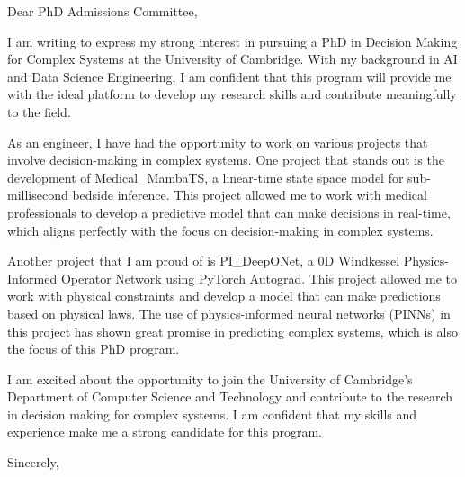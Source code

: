 \documentclass{letter}
\begin{document}
\opening{Dear PhD Admissions Committee,}

I am writing to express my strong interest in pursuing a PhD in Decision Making for Complex Systems at the University of Cambridge. With my background in AI and Data Science Engineering, I am confident that this program will provide me with the ideal platform to develop my research skills and contribute meaningfully to the field.

As an engineer, I have had the opportunity to work on various projects that involve decision-making in complex systems. One project that stands out is the development of Medical_MambaTS, a linear-time state space model for sub-millisecond bedside inference. This project allowed me to work with medical professionals to develop a predictive model that can make decisions in real-time, which aligns perfectly with the focus on decision-making in complex systems.

Another project that I am proud of is PI_DeepONet, a 0D Windkessel Physics-Informed Operator Network using PyTorch Autograd. This project allowed me to work with physical constraints and develop a model that can make predictions based on physical laws. The use of physics-informed neural networks (PINNs) in this project has shown great promise in predicting complex systems, which is also the focus of this PhD program.

I am excited about the opportunity to join the University of Cambridge's Department of Computer Science and Technology and contribute to the research in decision making for complex systems. I am confident that my skills and experience make me a strong candidate for this program.

\closing{Sincerely,}
\signature{Ismail Aissaoui}
\end{document}
